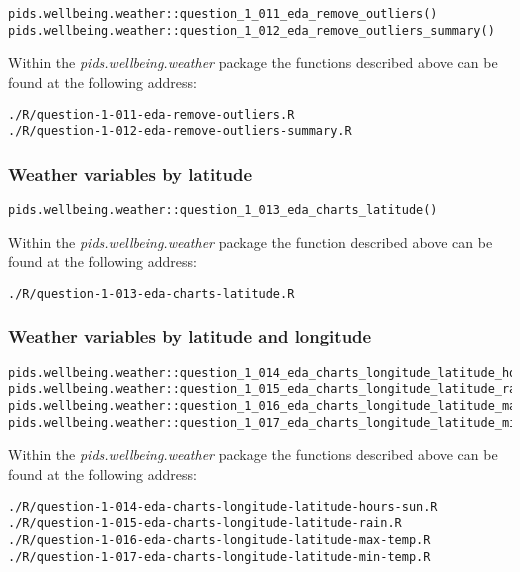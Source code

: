 \documentclass[12pt, oneside, openany]{book}
\begin{document}
\begin{verbatim}
pids.wellbeing.weather::question_1_011_eda_remove_outliers()
pids.wellbeing.weather::question_1_012_eda_remove_outliers_summary()
\end{verbatim}

Within the \emph{pids.wellbeing.weather} package the functions described above can be found at the following address:

\begin{verbatim}
./R/question-1-011-eda-remove-outliers.R
./R/question-1-012-eda-remove-outliers-summary.R
\end{verbatim}

\subsubsection*{Weather variables by latitude}

\begin{verbatim}
pids.wellbeing.weather::question_1_013_eda_charts_latitude()
\end{verbatim}

Within the \emph{pids.wellbeing.weather} package the function described above can be found at the following address:

\begin{verbatim}
./R/question-1-013-eda-charts-latitude.R
\end{verbatim}

\subsubsection*{Weather variables by latitude and longitude}

\begin{verbatim}
pids.wellbeing.weather::question_1_014_eda_charts_longitude_latitude_hours_sun()
pids.wellbeing.weather::question_1_015_eda_charts_longitude_latitude_rain()
pids.wellbeing.weather::question_1_016_eda_charts_longitude_latitude_max_temp()
pids.wellbeing.weather::question_1_017_eda_charts_longitude_latitude_min_temp()
\end{verbatim}

Within the \emph{pids.wellbeing.weather} package the functions described above can be found at the following address:

\begin{verbatim}
./R/question-1-014-eda-charts-longitude-latitude-hours-sun.R
./R/question-1-015-eda-charts-longitude-latitude-rain.R
./R/question-1-016-eda-charts-longitude-latitude-max-temp.R
./R/question-1-017-eda-charts-longitude-latitude-min-temp.R
\end{verbatim}
\end{document}
